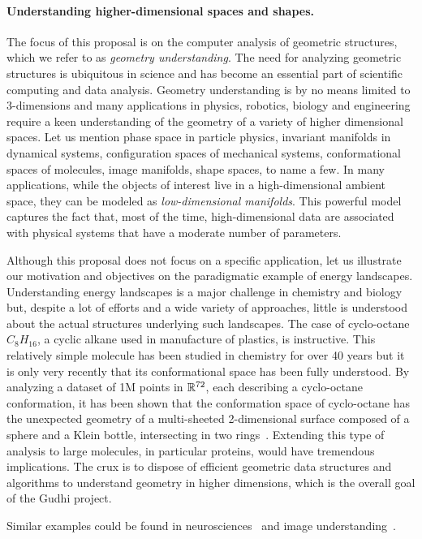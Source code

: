 \paragraph{Understanding higher-dimensional spaces and shapes.} 
The focus of this proposal is on the computer analysis of geometric structures, which we refer to as {\em geometry understanding}.  The need for analyzing geometric structures is ubiquitous in science and has become an essential part of scientific computing and data analysis. Geometry understanding is by no means limited to 3-dimensions and many applications in physics, robotics, biology and engineering require a keen understanding of the geometry of a variety of higher dimensional spaces. Let us mention phase space in particle physics, invariant manifolds in dynamical systems, configuration spaces of mechanical systems, conformational spaces of molecules, image manifolds, shape spaces, to name a few.  In many applications, while the objects of interest live in a high-dimensional ambient space, they  can be modeled as {\em low-dimensional manifolds}. This powerful model captures the fact that, most of the time, high-dimensional data are associated with physical systems that have a moderate number of  parameters.

Although this proposal does not focus on a specific application,  let us illustrate our motivation and objectives on the paradigmatic example of energy landscapes. Understanding  energy landscapes is a major challenge in chemistry and biology but,  despite a lot of efforts and a wide variety of approaches, little is understood about the actual structures underlying such landscapes. The case of cyclo-octane $C_8H_{16}$, a cyclic alkane used in manufacture of plastics, is instructive. This relatively simple molecule has been studied in chemistry for over 40 years but it is only very recently that its conformational space has been fully understood. By analyzing a dataset of 1M points in $\mathbb R^{72}$, each describing a cyclo-octane conformation, it has been shown that the conformation space of cyclo-octane has the unexpected geometry of  a multi-sheeted 2-dimensional surface composed of a sphere and a Klein bottle, intersecting in two rings~\cite{mtcw-tco-2010}. Extending this type of analysis to large molecules, in particular proteins, would have tremendous implications. The crux is to dispose of efficient geometric data structures and algorithms to understand geometry in higher dimensions, which is the overall goal of the Gudhi project.

Similar examples could be found in neurosciences~\cite{} and image understanding~\cite{}. 


